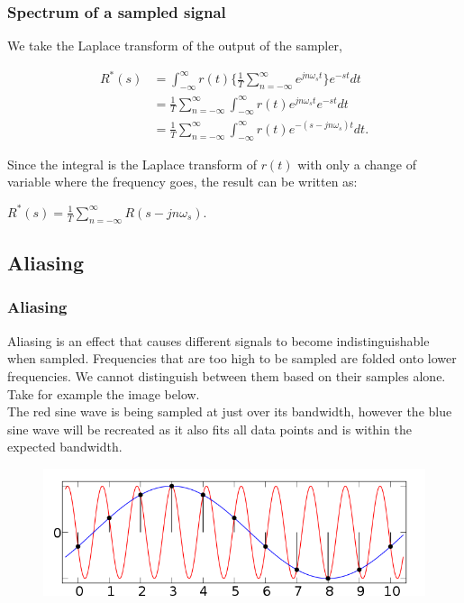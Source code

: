 \begin{frame}
	\frametitle{Spectrum of a sampled signal}
	We take the Laplace transform of the output of the sampler,
	\vspace{-2ex}
	\begin{center}
		\begin{equation}
			\begin{split}
			R^*(s)& = \int_{-\infty}^{\infty} r(t) \Big\{ \frac{1}{T} \sum_{n=-\infty}^{\infty} e^{jn\omega_st} \Big\} e^{-st} dt\\
			& = \frac{1}{T} \sum_{n=-\infty}^{\infty} \int_{-\infty}^{\infty} r(t) e^{jn\omega_st}e^{-st}dt\\
			& = \frac{1}{T} \sum_{n=-\infty}^{\infty} \int_{-\infty}^{\infty}r(t) e^{-(s-jn\omega_s)t} dt.
			\end{split}
		\end{equation}
	\end{center}
	Since the integral is the Laplace transform of $r(t)$ with only a change of variable where the frequency goes, the result can be written as:\\
	\begin{center}
		$R^*(s)=\frac{1}{T}\sum_{n=-\infty}^{\infty}R(s-jn\omega_s)$.
	\end{center}
\end{frame}

\subsection{Aliasing}

\begin{frame}
	\frametitle{Aliasing}
	Aliasing is	an effect that causes different signals to become indistinguishable when sampled. Frequencies that are too high to be sampled are folded onto lower frequencies. We cannot distinguish between them based on their samples alone.\\
	\medskip
	Take for example the image below.\\
	The red sine wave is being sampled at just over its bandwidth, however the blue sine wave will be recreated as it also fits all data points and is within the expected bandwidth.
	\begin{figure}
		\includegraphics[width=0.75\linewidth]{aliasing}
	\end{figure}
\end{frame}

